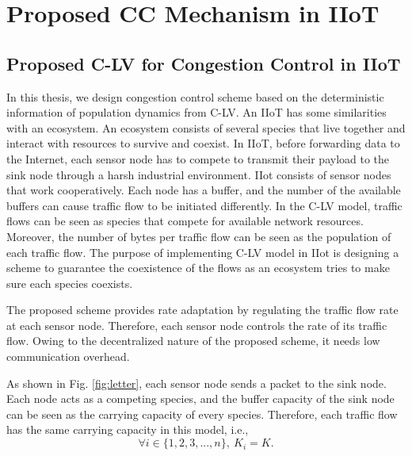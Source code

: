\chapter{Proposed CC Mechanism in IIoT}

\section{Proposed C-LV for Congestion Control in IIoT}

In this thesis, we design congestion control scheme based on the deterministic information of population dynamics from C-LV. An IIoT has some similarities with an ecosystem. An ecosystem consists of several species that live together and interact with resources to survive and coexist. In IIoT, before forwarding data to the Internet, each sensor node has to compete to transmit their payload to the sink node through a harsh industrial environment.
IIot consists of sensor nodes that work cooperatively. Each node has a buffer, and the number of the available buffers can cause traffic flow to be initiated differently. In the C-LV model, traffic flows can be seen as species that compete for available network resources. Moreover, the number of bytes per traffic flow can be seen as the population of each traffic flow. The purpose of implementing C-LV model in IIot is designing a scheme to guarantee the coexistence of the flows as an ecosystem tries to make sure each species coexists. 

The proposed scheme provides rate adaptation by regulating the traffic flow rate at each sensor node. Therefore, each sensor node controls the rate of its traffic flow. Owing to the decentralized nature of the proposed scheme, it needs low communication overhead.




As shown in Fig. \ref{fig:letter}, each sensor node sends a packet to the sink node. Each node acts as a competing species, and the buffer capacity of the sink node can be seen as the carrying capacity of every species. Therefore, each traffic flow has the same carrying capacity in this model, i.e., 
\begin{equation}
\label{assume1}
\forall i \in \{1,2,3,...,n\},~K_i=K.
\end{equation}

